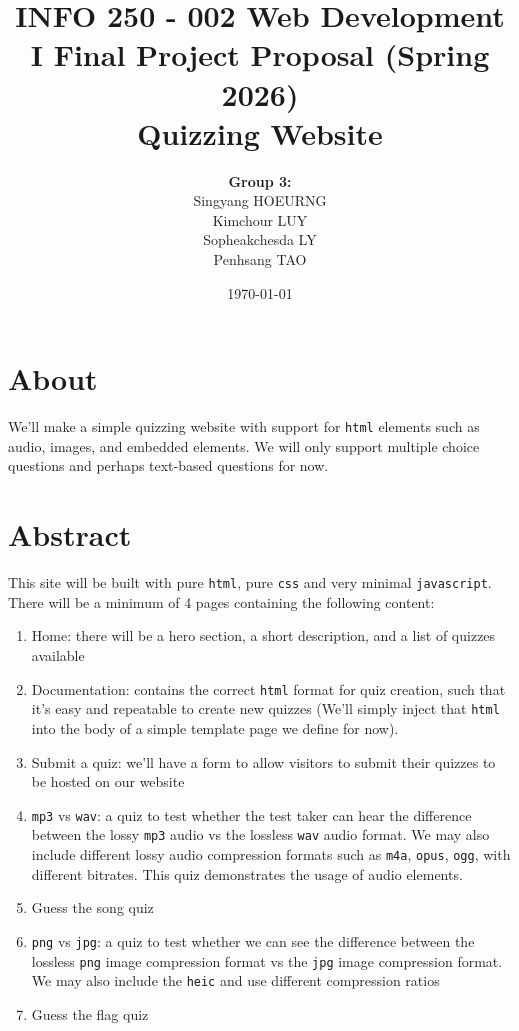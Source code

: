 \documentclass[12pt, a4paper, titlepage]{article}
\title{
  \Huge{INFO 250 - 002 Web Development I Final Project Proposal (Spring 2026)}\\
\huge{\textbf{Quizzing Website}}}
\author{\textbf{Group 3:}\\
 Singyang HOEURNG\\
 Kimchour LUY\\ 
 Sopheakchesda LY\\
 Penhsang TAO\\
}
\date{\today}
\begin{document}
\maketitle

\section*{About}

We'll make a simple quizzing website with support for \texttt{html} elements such as audio, images, and embedded elements. We will only support multiple choice questions and perhaps text-based questions for now.

\section*{Abstract}

This site will be built with pure \texttt{html}, pure \texttt{css} and very minimal \texttt{javascript}. There will be a minimum of 4 pages containing the following content:

\begin{enumerate}
  \item Home: there will be a hero section, a short description, and a list of quizzes available
  \item Documentation: contains the correct \texttt{html} format for quiz creation, such that it's easy and repeatable to create new quizzes (We'll simply inject that \texttt{html} into the body of a simple template page we define for now).
\item Submit a quiz: we'll have a form to allow visitors to submit their quizzes to be hosted on our website
  \item \texttt{mp3} vs \texttt{wav}: a quiz to test whether the test taker can hear the difference between the lossy \texttt{mp3} audio vs the lossless \texttt{wav} audio format. We may also include different lossy audio compression formats such as \texttt{m4a}, \texttt{opus}, \texttt{ogg}, with different bitrates. This quiz demonstrates the usage of audio elements.
  \item Guess the song quiz
  \item \texttt{png} vs \texttt{jpg}: a quiz to test whether we can see the difference between the lossless \texttt{png} image compression format vs the \texttt{jpg} image compression format. We may also include the \texttt{heic} and use different compression ratios
  \item Guess the flag quiz
  \end{enumerate}
\end{document}
